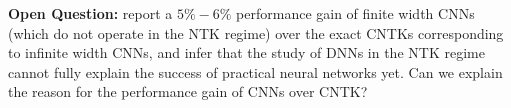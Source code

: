 \textbf{Open Question:} \cite{arora2019exact} report a $5\% - 6\%$ performance gain of finite width CNNs (which do not operate in the NTK regime) over the exact CNTKs corresponding to infinite width CNNs, and infer that the study of DNNs in the NTK regime cannot fully explain the success of practical neural networks yet. Can we explain the reason for the performance gain of CNNs over CNTK?%

\begin{comment}
Fourth, we find that there is still a $5\% - 6\%$ performance gap between CNTKs and CNNs. Since CNTKs exactly correspond to infinitely wide CNNs, this performance gap implies that finite width has its benefits. Therefore, it is likely that recent theoretical work on over-parameterization that operates in the NTK regime cannot fully explain the success of neural networks yet, and we believe it is an interesting open problem to characterize this gap.
\end{comment}